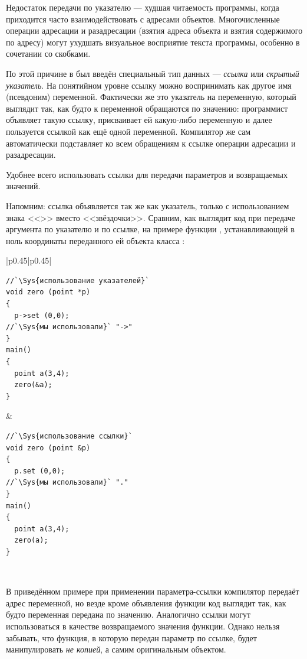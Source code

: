 Недостаток передачи по указателю --- худшая читаемость программы, когда приходится часто взаимодействовать с адресами
объектов. Многочисленные операции адресации и разадресации (взятия адреса объекта и взятия содержимого по адресу) могут
ухудшать визуальное восприятие текста программы, особенно в сочетании со скобками. 

По этой причине в  был введён специальный тип данных --- \emph{ссылка} или 
\emph{скрытый указатель}. На понятийном уровне ссылку можно воспринимать как другое имя
(псевдоним) переменной. Фактически же это указатель на переменную, который выглядит так, как будто к переменной
обращаются по значению: программист объявляет такую ссылку, присваивает ей какую-либо переменную и далее пользуется
ссылкой как ещё одной переменной. Компилятор же сам автоматически подставляет ко всем обращениям к ссылке операции
адресации и разадресации.

Удобнее всего использовать ссылки для передачи параметров и возвращаемых значений.

Напомним: ссылка объявляется так же как указатель, только с использованием знака <<\Sys{\&}>> вместо <<звёздочки>>.
Сравним, как выглядит код при передаче аргумента по указателю и по ссылке, на примере функции
, устанавливающей в ноль координаты переданного ей объекта класса
:
\begin{center}
\begin{tabular}{|p{}|p{}|}
\hline
\begin{lstlisting}
//`\Sys{использование указателей}`
void zero (point *p) 
{
  p->set (0,0);
//`\Sys{мы использовали}` "->"
}
main() 
{
  point a(3,4);
  zero(&a);
}
\end{lstlisting}
&
\begin{lstlisting}
//`\Sys{использование ссылки}`
void zero (point &p) 
{
  p.set (0,0);
//`\Sys{мы использовали}` "."
}
main() 
{
  point a(3,4);
  zero(a);
}
\end{lstlisting}
\\\hline
\end{tabular}
\end{center}

В приведённом примере при применении параметра-ссылки компилятор передаёт 
адрес переменной, но везде кроме объявления функции код выглядит так, как 
будто переменная передана по значению. Аналогично ссылки могут использоваться 
в качестве возвращаемого значения функции. Однако нельзя забывать, что функция, 
в которую передан параметр по ссылке, будет манипулировать \emph{не копией}, а самим 
оригинальным объектом.

